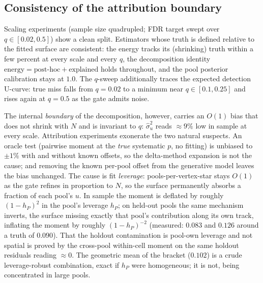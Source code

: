 \documentclass[11pt]{article}
\begin{document}
\subsection{Consistency of the attribution boundary}\label{sec:leverage}

Scaling experiments (sample size quadrupled; FDR target swept over
$q\in[0.02,0.5]$) show a clean split. Estimators whose truth is defined relative to
the fitted surface are consistent: the energy tracks its (shrinking) truth within a
few percent at every scale and every $q$, the decomposition identity
$\text{energy}=\text{post-hoc}+\text{explained}$ holds throughout, and the pool
posterior calibration stays at $1.0$. The $q$-sweep additionally traces the expected
detection U-curve: true miss falls from $q=0.02$ to a minimum near $q\in[0.1,0.25]$
and rises again at $q=0.5$ as the gate admits noise.

The internal \emph{boundary} of the decomposition, however, carries an $O(1)$ bias
that does not shrink with $N$ and is invariant to $q$: $\hat\sigma_u^2$ reads
$\approx 9\%$ low in sample at every scale. Attribution experiments exonerate the two
natural suspects. An oracle test (pairwise moment at the \emph{true} systematic $p$,
no fitting) is unbiased to $\pm1\%$ with and without known offsets, so the
delta-method expansion is not the cause; and removing the known per-pool offset from
the generative model leaves the bias unchanged. The cause is fit
\emph{leverage}: pools-per-vertex-star stays $O(1)$ as the gate refines in proportion
to $N$, so the surface permanently absorbs a fraction of each pool's $u$. In sample
the moment is deflated by roughly $(1-h_P)^2$ in the pool's leverage $h_P$; on
held-out pools the same mechanism inverts, the surface missing exactly that pool's
contribution along its own track, inflating the moment by roughly $(1-h_P)^{-2}$
(measured: $0.083$ and $0.126$ around a truth of $0.090$). That the holdout
contamination is pool-own leverage and not spatial is proved by the cross-pool
within-cell moment on the same holdout residuals reading $\approx 0$. The geometric
mean of the bracket ($0.102$) is a crude leverage-robust combination, exact if $h_P$
were homogeneous; it is not, being concentrated in large pools.
\end{document}
